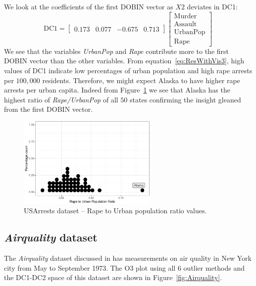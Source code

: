 \documentclass[a4paper,11pt]{article}
\begin{document}
We look at the coefficients of the first DOBIN vector as $X2$ deviates in DC1:
\begin{equation}\label{eq:ResWithVis3}
	\text{DC1} = \begin{bmatrix}
		0.173 & 0.077 & -0.675 & 0.713
	\end{bmatrix}
	\begin{bmatrix}
		\text{Murder}   \\
		\text{Assault}  \\
		\text{UrbanPop} \\
		\text{Rape}
	\end{bmatrix} \,
\end{equation}
We see that the variables \textit{UrbanPop} and \textit{Rape} contribute more to the first DOBIN vector than the other variables. From equation~\eqref{eq:ResWithVis3}, high values of DC1 indicate low percentages of urban population and high rape arrests per $100,000$ residents. Therefore, we might expect Alaska to have higher rape arrests per urban capita. Indeed from Figure~\ref{fig:USArrests3} we see that Alaska has the highest ratio of \textit{Rape/UrbanPop} of all $50$ states confirming the insight gleaned from the first DOBIN vector.

\begin{figure}[!ht]
	\centering
	\includegraphics[width=0.6\textwidth]{Ex3_3.pdf}
	\caption{USArrests dataset -- Rape to Urban population ratio values.}
	\label{fig:USArrests3}
\end{figure}

\subsection{\textit{Airquality} dataset}\label{sec:ResWithVis4}

The \textit{Airquality} dataset discussed in \cite{john1983graphical} has measurements on air quality in New York city from May to September 1973. The O3 plot using all $6$ outlier methods and the DC1-DC2 space of this dataset are shown in Figure~\ref{fig:Airquality}.
\end{document}
